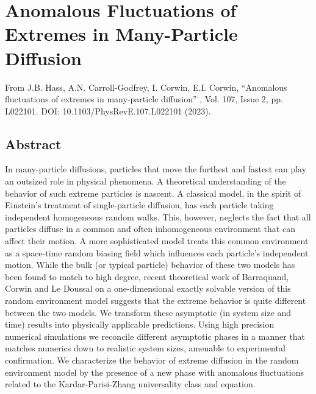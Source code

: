 \def\maxnt{\mathrm{Max}^{N}_t}
\def\envnt{\mathrm{Env}^{N}_t}
\def\snt{\mathrm{Sam}^{N}_t}


\chapter{Anomalous Fluctuations of Extremes in Many-Particle Diffusion}
\label{ch2_1Drandom}

From J.B. Hass, A.N. Carroll-Godfrey, I. Corwin, E.I. Corwin, ``Anomalous fluctuations of extremes in many-particle diffusion'' , Vol. 107, Issue 2, pp. L022101. DOI: 10.1103/PhysRevE.107.L022101 (2023).

\section{Abstract}
In many-particle diffusions, particles that move the furthest and fastest can play an outsized role in physical phenomena. A theoretical understanding of the behavior of such extreme particles is nascent. A classical model, in the spirit of Einstein's  treatment of single-particle diffusion, has each particle taking independent homogeneous random walks. This, however, neglects the fact that all particles diffuse in a common and often inhomogeneous environment that can affect their motion. A more sophisticated model treats this common environment as a space-time random biasing field which influences each particle's independent motion. While the bulk (or typical particle) behavior of these two models has been found to match to high degree, recent theoretical work of Barraquand, Corwin and Le Doussal on a one-dimensional exactly solvable version of this random environment model suggests that the extreme behavior is quite different between the two models. We transform these asymptotic (in system size and time) results into physically applicable predictions. Using high precision numerical simulations we reconcile different asymptotic phases in a manner that matches numerics down to realistic system sizes, amenable to experimental confirmation. We characterize the behavior of extreme diffusion in the random environment model by the presence of a new phase with anomalous fluctuations related to the Kardar-Parisi-Zhang universality class and equation.

